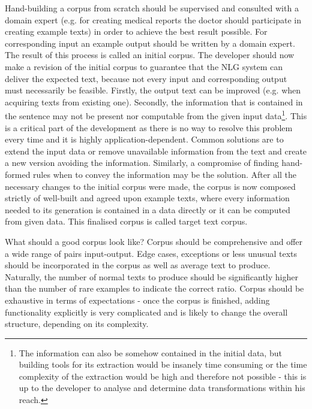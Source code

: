Hand-building a corpus from scratch should be supervised and consulted with a domain expert (e.g. for creating medical reports the doctor should participate in creating example texts) in order to achieve the best result possible. For corresponding input an example output should be written by a domain expert. The result of this process is called an initial corpus. The developer should now make a revision of the initial corpus to guarantee that the NLG system can deliver the expected text, because not every input and corresponding output must necessarily be feasible. Firstly, the output text can be improved (e.g. when acquiring texts from existing one). Secondly, the information that is contained in the sentence may not be present nor computable from the given input data\footnote{The information can also be somehow contained in the initial data, but building tools for its extraction would be insanely time consuming or the time complexity of the extraction would be high and therefore not possible - this is up to the developer to analyse and determine data transformations within his reach.}. This is a critical part of the development as there is no way to resolve this problem every time and it is highly application-dependent. Common solutions are to extend the input data or remove unavailable information from the text and create a new version avoiding the information. Similarly, a compromise of finding hand-formed rules when to convey the information may be the solution. After all the necessary changes to the initial corpus were made, the corpus is now composed strictly of well-built and agreed upon example texts, where every information needed to its generation is contained in a data directly or it can be computed from given data. This finalised corpus is called target text corpus.

What should a good corpus look like? Corpus should be comprehensive and offer a wide range of pairs input-output. Edge cases, exceptions or less unusual texts should be incorporated in the corpus as well as average text to produce. Naturally, the number of normal texts to produce should be significantly higher than the number of rare examples to indicate the correct ratio. Corpus should be exhaustive in terms of expectations - once the corpus is finished, adding functionality explicitly is very complicated and is likely to change the overall structure, depending on its complexity. 


